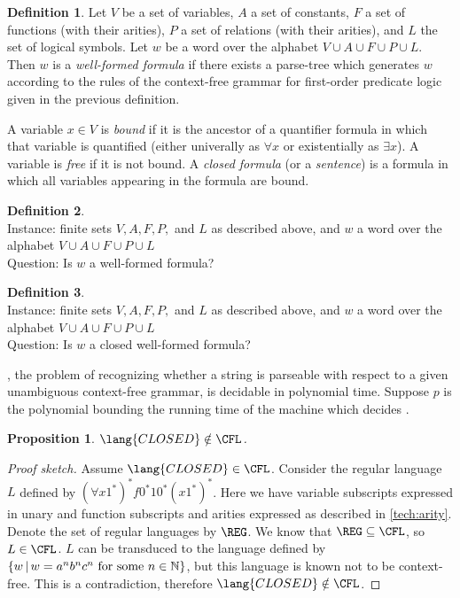 \documentclass[draft]{article}
\newenvironment{sketch}{\begin{proof}[Proof sketch]}{\end{proof}}
\newtheorem{proposition}{Proposition}
\theoremstyle{remark} \newtheorem{technicality}{Technical note}
\theoremstyle{definition} \newtheorem{definition}{Definition}
\newcommand{\lb}{\left\{} %
\newcommand{\rb}{\right\}} %
\newcommand{\st}{\,\middle|\,} %
\newenvironment{langdef}[1]{\begin{definition}{\lang{#1}}}{\end{definition}}
\newenvironment{instance}{\\Instance:}{}
\newenvironment{question}{\\Question:}{}
\begin{document}
\begin{definition}
  Let $V$ be a set of variables, $A$ a set of constants, $F$ a set of functions (with their arities), $P$ a set of relations (with their arities), and $L$ the set of logical symbols.
  Let $w$ be a word over the alphabet $V\cup A\cup F\cup P\cup L$.
  Then $w$ is a \emph{well-formed formula} if there exists a parse-tree which generates $w$ according to the rules of the context-free grammar for first-order predicate logic given in the previous definition.

  A variable $x\in V$ is \emph{bound} if it is the ancestor of a quantifier formula in which that variable is quantified (either univerally as $\forall x$ or existentially as $\exists x$).
  A variable is \emph{free} if it is not bound.
  A \emph{closed formula} (or a \emph{sentence}) is a formula in which all variables appearing in the formula are bound.
\end{definition}

\begin{langdef}{PARSEABLE}
  \begin{instance}
    finite sets $V, A, F, P,$ and $L$ as described above, and $w$ a word over the alphabet $V\cup A\cup F\cup P\cup L$
  \end{instance}
  \begin{question}
    Is $w$ a well-formed formula?
  \end{question}
\end{langdef}

\begin{langdef}{CLOSED}
  \begin{instance}
    finite sets $V, A, F, P,$ and $L$ as described above, and $w$ a word over the alphabet $V\cup A\cup F\cup P\cup L$
  \end{instance}
  \begin{question}
    Is $w$ a closed well-formed formula?
  \end{question}
\end{langdef}

, the problem of recognizing whether a string is parseable with respect to a given unambiguous context-free grammar, is decidable in polynomial time.
Suppose $p$ is the polynomial bounding the running time of the machine which decides .

\begin{proposition}
  $\lang{CLOSED}\notin\CFL$.
\end{proposition}
\begin{sketch}
  Assume $\lang{CLOSED}\in\CFL$.
  Consider the regular language $L$ defined by $(\forall x1^*)^* f0^*10^*(x1^*)^*$.
  Here we have variable subscripts expressed in unary and function subscripts and arities expressed as described in \autoref{tech:arity}.
  Denote the set of regular languages by $\REG$.
  We know that $\REG\subseteq\CFL$, so $L\in\CFL$.
  $L$ can be transduced to the language defined by $\lb w \st w=a^nb^nc^n\textnormal{ for some } n\in\mathbb{N}\rb$, but this language is known not to be context-free.
  This is a contradiction, therefore $\lang{CLOSED}\notin\CFL$.
\end{sketch}
\end{document}

